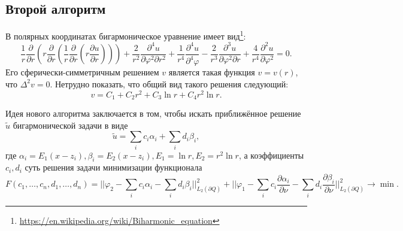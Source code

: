 \documentclass[a4paper, 12pt]{article}
\begin{document}
\subsection{Второй алгоритм}

В полярных координатах бигармоническое уравнение имеет вид\footnote{\url{https://en.wikipedia.org/wiki/Biharmonic_equation}}:
\begin{equation}
  \dfrac{1}{r} \dfrac{\partial}{\partial r} \left(r \dfrac{\partial}{\partial r} \left( \dfrac{1}{r} \dfrac{\partial}{\partial r} \left(r \dfrac{\partial u}{\partial r}   \right)  \right)    \right) + \dfrac{2}{r^2} \dfrac{\partial^4 u}{\partial \varphi^2 \partial r^2} +\dfrac{1}{r^4} \dfrac{\partial^4 u}{\partial^4 \varphi} - \dfrac{2}{r^3} \dfrac{\partial^3 u}{\partial \varphi^2 \partial r} + \dfrac{4}{r^4} \dfrac{\partial^2 u}{\partial \varphi^2}=0.  
\end{equation}
Его сферически-симметричным решением $v$ является такая функция $v=v(r)$, что $\Delta^2 v=0$.
Нетрудно показать, что общий вид такого решения следующий:
\begin{equation*}
  v = C_1 + C_2 r^2 + C_3 \ln r + C_4 r^2 \ln r.
\end{equation*}

Идея нового алгоритма заключается в том, чтобы искать приближённое решение $\tilde{u}$ бигармонической задачи в виде
\begin{equation*}
  \tilde{u} = \sum_i c_i \alpha_i + \sum_i d_i \beta_i,
\end{equation*}
где $\alpha_i=E_1(x-z_i), \beta_i = E_2(x-z_i), E_1=\ln r, E_2= r^2 \ln r$, а коэффициенты $c_i, d_i$ суть решения задачи минимизации функционала
\begin{equation*}
  F(c_1,\dots,c_n,d_1,\dots,d_n)= \biggl|\biggl|\varphi_2 -\sum_i c_i \alpha_i-\sum_i d_i \beta_i   \biggl|\biggl|_{L_2(\partial Q)}^2+\biggl|\biggl|\varphi_1 -\sum_i c_i \dfrac{\partial \alpha_i}{\partial \nu} -\sum_i d_i \dfrac{\partial \beta_i }{\partial \nu}   \biggl|\biggl|_{L_2(\partial Q)}^2 \rightarrow \min .
\end{equation*}
\end{document}
